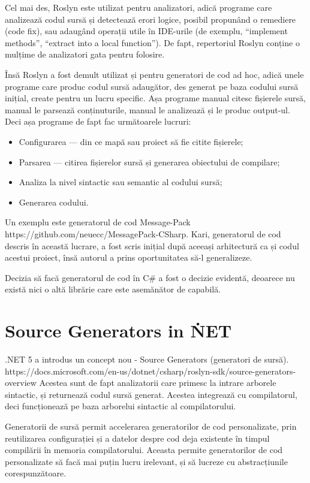\documentclass{report}
\begin{document}
Cel mai des, Roslyn este utilizat pentru analizatori, adică programe care analizează codul sursă și detectează erori logice, posibil propunând o remediere (code fix), sau adaugând operații utile în IDE-urile (de exemplu, ``implement methods'', ``extract into a local function'').
De fapt, repertoriul Roslyn conține o mulțime de analizatori gata pentru folosire.

Însă Roslyn a fost demult utilizat și pentru generatori de cod ad hoc, adică unele programe care produc codul sursă adaugător, des generat pe baza codului sursă inițial, create pentru un lucru specific.
Așa programe manual citesc fișierele sursă, manual le parsează conținuturile, manual le analizează și le produc output-ul.
Deci așa programe de fapt fac următoarele lucruri:

\begin{itemize}
  \item Configurarea --- din ce mapă sau proiect să fie citite fișierele;
  \item Parsarea --- citirea fișierelor sursă și generarea obiectului de compilare;
  \item Analiza la nivel sintactic sau semantic al codului sursă;
  \item Generarea codului.
\end{itemize}

Un exemplu este generatorul de cod Message-Pack https://github.com/neuecc/MessagePack-CSharp.
Kari, generatorul de cod descris în această lucrare, a fost scris inițial după aceeași arhitectură ca și codul acestui proiect, însă autorul a prins oportunitatea să-l generalizeze.

Decizia să facă generatorul de cod în C# a fost o decizie evidentă, deoarece nu există nici o altă librărie care este asemănător de capabilă.

\section{Source Generators in \. NET}

.NET 5 a introdus un concept nou - Source Generators (generatori de sursă). https://docs.microsoft.com/en-us/dotnet/csharp/roslyn-sdk/source-generators-overview
Acestea sunt de fapt analizatorii care primesc la intrare arborele sintactic, și returnează codul sursă generat.
Acestea integrează cu compilatorul, deci funcționează pe baza arborelui sintactic al compilatorului.

Generatorii de sursă permit accelerarea generatorilor de cod personalizate, prin reutilizarea configurației și a datelor despre cod deja existente în timpul compilării în memoria compilatorului.
Aceasta permite generatorilor de cod personalizate să facă mai puțin lucru irelevant, și să lucreze cu abstracțiunile corespunzătoare.
\end{document}
